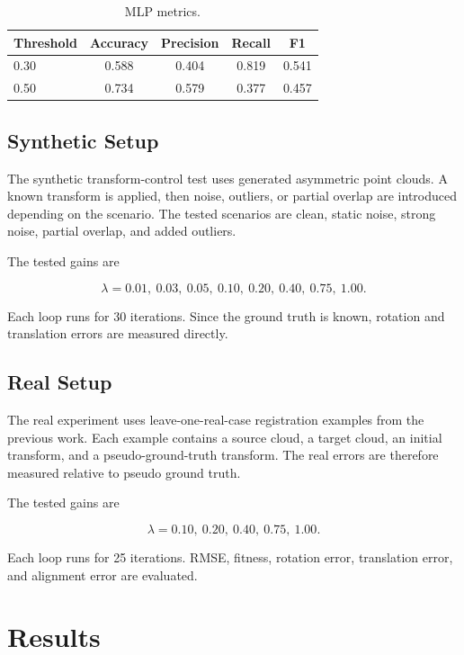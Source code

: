 \documentclass[conference]{IEEEtran}
\begin{document}
\begin{table}[t]
\centering
\caption{MLP metrics.}
\label{tab:mlp_metrics}
\begin{tabular}{lcccc}
\toprule
Threshold & Accuracy & Precision & Recall & F1 \\
\midrule
0.30 & 0.588 & 0.404 & 0.819 & 0.541 \\
0.50 & 0.734 & 0.579 & 0.377 & 0.457 \\
\bottomrule
\end{tabular}
\end{table}

\subsection{Synthetic Setup}
\label{subsec:synthetic_setup}

The synthetic transform-control test uses generated asymmetric point clouds. A known transform is applied, then noise, outliers, or partial overlap are introduced depending on the scenario. The tested scenarios are clean, static noise, strong noise, partial overlap, and added outliers.

The tested gains are

\[
\lambda =
0.01,\ 0.03,\ 0.05,\ 0.10,\ 0.20,\ 0.40,\ 0.75,\ 1.00 .
\]

Each loop runs for 30 iterations. Since the ground truth is known, rotation and translation errors are measured directly.

\subsection{Real Setup}
\label{subsec:real_setup}

The real experiment uses leave-one-real-case registration examples from the previous work. Each example contains a source cloud, a target cloud, an initial transform, and a pseudo-ground-truth transform. The real errors are therefore measured relative to pseudo ground truth.

The tested gains are

\[
\lambda =
0.10,\ 0.20,\ 0.40,\ 0.75,\ 1.00 .
\]

Each loop runs for 25 iterations. RMSE, fitness, rotation error, translation error, and alignment error are evaluated.

\section{Results}
\label{sec:results}
\end{document}
